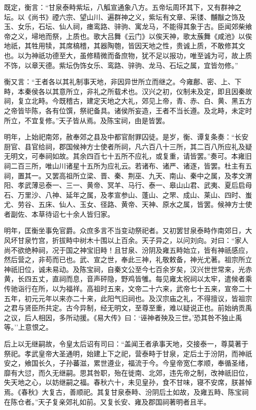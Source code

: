 \documentclass[]{article}
\begin{document}
既定，衡言：``甘泉泰畤紫坛，八觚宣通象八方。五帝坛周环其下，又有群神之坛。以《尚书》禋六宗、望山川、遍群神之义，紫坛有文章、采镂、黼黻之饰及玉、女乐，石坛、仙人祠，瘗鸾路、骍驹、寓龙马，不能得其象于古。臣闻郊柴飨帝之义，埽地而祭，上质也。歌大吕舞《云门》以俟天神，歌太蔟舞《咸池》以俟地祇，其牲用犊，其席槁稽，其器陶匏，皆因天地之性，贵诚上质，不敢修其文也。以为神祇功德至大，虽修精微而备庶物，犹不足以报功，唯至诚为可，故上质不饰，以章天德。紫坛伪饰女乐、鸾路、骍驹、龙马、石坛之属，宜皆勿修。''

衡又言：``王者各以其礼制事天地，非因异世所立而继之。今雍鄜、密、上、下畤，本秦侯各以其意所立，非礼之所载术也。汉兴之初，仪制未及定，即且因秦故祠，复立北畤。今既稽古，建定天地之大礼，郊见上帝，青、赤、白、黄、黑五方之帝皆毕陈，各有位馔，祭祀备具。诸侯所妄造，王者不当长遵。及北畤，未定时所立，不宜复修。''天子皆从焉。及陈宝祠，由是皆罢。

明年，上始祀南郊，赦奉郊之县及中都官耐罪囚徒。是岁，衡、谭复条奏：``长安厨官、县官给祠，郡国候神方士使者所祠，凡六百八十三所，其二百八所应礼及疑无明文，可奉祠如故。其余四百七十五所不应礼，或复重，请皆罢。''奏可。本雍旧祠二百三所，唯山川诸星十五所为应礼云。若诸布、诸严、诸逐，皆罢。杜主有五祠，置其一。又罢高祖所立梁、晋、秦、荆巫、九天、南山、秦中之属，及孝文渭阳、孝武薄忌泰一、三一、黄帝、冥羊、马行、泰一、皋山山君、武夷、夏后启母石、万里沙、八神、延年之属，及孝宣参山、蓬山、之罘、成山、莱山、四时、蚩尤、劳谷、五床、仙人、玉女、径路、黄帝、天神、原水之属，皆罢。候神方士使者副佐、本草待诏七十余人皆归家。

明年，匡衡坐事免官爵。众庶多言不当变动祭祀者。又初罢甘泉泰畤作南郊日，大风坏甘泉竹宫，折拔畤中树木十围以上百余。天子异之，以问刘向。对曰：``家人尚不欲绝种祠，况于国之神宝旧畤！且甘泉、汾阴及雍五畤始立，皆有神祇感应，然后营之，非苟而已也。武、宣之世，奉此三神，礼敬敕备，神光尤著。祖宗所立神祇旧位，诚未易动。及陈宝祠，自秦文公至今七百余岁矣，汉兴世世常来，光赤黄，长四五丈，直祠而息，音声砰隐，野鸡皆雊。每见雍太祝祠以太牢，遣候者乘传驰诣行在所，以为福祥。高祖时五来，文帝二十六来，武帝七十五来，宣帝二十五年，初元元年以来亦二十来，此阳气旧祠也。及汉宗庙之礼，不得擅议，皆祖宗之君与贤臣所共定。古今异制，经无明文，至尊至重，难以疑说正也。前始纳贡禹之议，后人相因，多所动援。《易大传》曰：`诬神者殃及三世。'恐其咎不独止禹等。''上意恨之。

后上以无继嗣故，令皇太后诏有司曰：``盖闻王者承事天地，交接泰一，尊莫著于祭祀。孝武皇帝大圣通明，始建上下之祀，营泰畤于甘泉，定后土于汾阴，而神祇安之，飨国长久，子孙蕃滋，累世遵业，福流于今。今皇帝宽仁孝顺，奉循圣绪，靡有大愆，而久无继嗣。思其咎职，殆在徙南、北郊，违先帝之制，改神祇旧位，失天地之心，以妨继嗣之福。春秋六十，未见皇孙，食不甘味，寝不安席，朕甚悼焉。《春秋》大复古，善顺祀。其复甘泉泰畤、汾阴后土如故，及雍五畤、陈宝祠在陈仓者。''天子复亲郊礼如前。又复长安、雍及郡国祠著明者且半。
\end{document}
